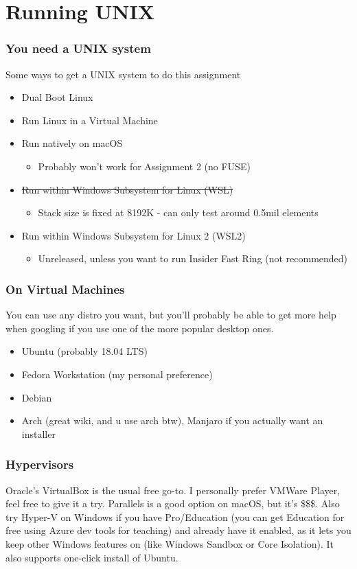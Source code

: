 \documentclass{beamer}
\begin{document}
\section{Running UNIX}
\begin{frame}
  \frametitle{You need a UNIX system}
  Some ways to get a UNIX system to do this assignment
  \begin{itemize}
    \item Dual Boot Linux
    \item Run Linux in a Virtual Machine
    \item Run natively on macOS
    \begin{itemize}
      \item Probably won't work for Assignment 2 (no FUSE)
    \end{itemize}
    \item \sout{Run within Windows Subsystem for Linux (WSL)}
    \begin{itemize}
      \item Stack size is fixed at 8192K - can only test around 0.5mil elements
    \end{itemize}
    \item Run within Windows Subsystem for Linux 2 (WSL2)
    \begin{itemize}
      \item Unreleased, unless you want to run Insider Fast Ring (not recommended)
    \end{itemize}
  \end{itemize}
\end{frame}
\begin{frame}
  \frametitle{On Virtual Machines}
  You can use any distro you want, but you'll probably be able to get more help when googling if you use one of the more popular desktop ones.
  \begin{itemize}
    \item Ubuntu (probably 18.04 LTS)
    \item Fedora Workstation (my personal preference)
    \item Debian
    \item Arch (great wiki, and u use arch btw), Manjaro if you actually want an installer
  \end{itemize}
\end{frame}
\begin{frame}
  \frametitle{Hypervisors}
  Oracle's VirtualBox is the usual free go-to. I personally prefer VMWare Player, feel free to give it a try. Parallels is a good option on macOS, but it's \$\$\$.\newline
  \newline
  Also try Hyper-V on Windows if you have Pro/Education (you can get Education for free using Azure dev tools for teaching) and already have it enabled, as it lets you keep other Windows features on (like Windows Sandbox or Core Isolation). It also supports one-click install of Ubuntu.
\end{frame}
\end{document}
